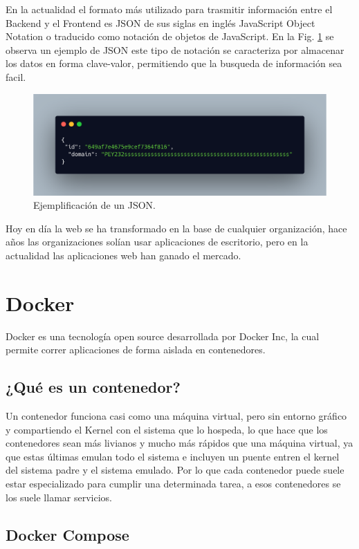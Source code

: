 En la actualidad el formato más utilizado para trasmitir información entre el Backend y el Frontend es JSON de sus siglas en inglés JavaScript Object Notation o traducido como notación de objetos de JavaScript. En la Fig. \ref{fig:ejemplo-json} se observa un ejemplo de JSON este tipo de notación se caracteriza por almacenar los datos en forma clave-valor, permitiendo que la busqueda de información sea facil.

\begin{figure}
    \centering
    \includegraphics[width=.5\textwidth]{imgs/json-example.png}
    \caption{Ejemplificación de un JSON.}
    \label{fig:ejemplo-json}
\end{figure}

Hoy en día la web se ha transformado en la base de cualquier organización, hace años las organizaciones solían usar aplicaciones de escritorio, pero en la actualidad las aplicaciones web han ganado el mercado.

\section{Docker}


Docker es una tecnología open source desarrollada por Docker Inc, la cual permite correr aplicaciones de forma aislada en contenedores.

\subsection{¿Qué es un contenedor?}

Un contenedor funciona casi como una máquina virtual, pero sin entorno gráfico y compartiendo el Kernel \cite{keepcoding_que_2022} con el sistema que lo hospeda, lo que hace que los contenedores sean más livianos y mucho más rápidos que una máquina virtual, ya que estas últimas emulan todo el sistema e incluyen un puente entren el kernel del sistema padre y el sistema emulado. Por lo que cada contenedor puede suele estar especializado para cumplir una determinada tarea, a esos contenedores se los suele llamar servicios.

\subsection{Docker Compose}


